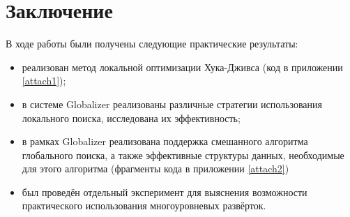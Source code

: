 \section{Заключение}
В ходе работы были получены следующие практические результаты:
\begin{itemize}
  \item реализован метод локальной оптимизации Хука-Дживса (код в приложении \ref{attach1});
  \item в системе Globalizer реализованы различные стратегии использования локального поиска,
  исследована их эффективность;
  \item в рамках Globalizer реализована поддержка смешанного алгоритма глобального поиска,
  а также эффективные структуры данных, необходимые для этого алгоритма (фрагменты кода в приложении \ref{attach2})
  \item был проведён отдельный эксперимент для выяснения возможности практического использования многоуровневых развёрток.
\end{itemize}
